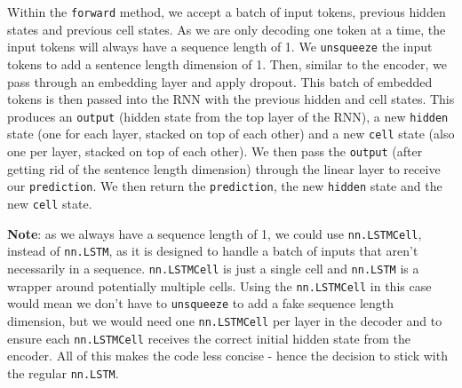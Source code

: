 \documentclass[11pt]{article}
\begin{document}
Within the \texttt{forward} method, we accept a batch of input tokens,
previous hidden states and previous cell states. As we are only decoding
one token at a time, the input tokens will always have a sequence length
of 1. We \texttt{unsqueeze} the input tokens to add a sentence length
dimension of 1. Then, similar to the encoder, we pass through an
embedding layer and apply dropout. This batch of embedded tokens is then
passed into the RNN with the previous hidden and cell states. This
produces an \texttt{output} (hidden state from the top layer of the
RNN), a new \texttt{hidden} state (one for each layer, stacked on top of
each other) and a new \texttt{cell} state (also one per layer, stacked
on top of each other). We then pass the \texttt{output} (after getting
rid of the sentence length dimension) through the linear layer to
receive our \texttt{prediction}. We then return the \texttt{prediction},
the new \texttt{hidden} state and the new \texttt{cell} state.

\textbf{Note}: as we always have a sequence length of 1, we could use
\texttt{nn.LSTMCell}, instead of \texttt{nn.LSTM}, as it is designed to
handle a batch of inputs that aren't necessarily in a sequence.
\texttt{nn.LSTMCell} is just a single cell and \texttt{nn.LSTM} is a
wrapper around potentially multiple cells. Using the
\texttt{nn.LSTMCell} in this case would mean we don't have to
\texttt{unsqueeze} to add a fake sequence length dimension, but we would
need one \texttt{nn.LSTMCell} per layer in the decoder and to ensure
each \texttt{nn.LSTMCell} receives the correct initial hidden state from
the encoder. All of this makes the code less concise - hence the
decision to stick with the regular \texttt{nn.LSTM}.
\end{document}
